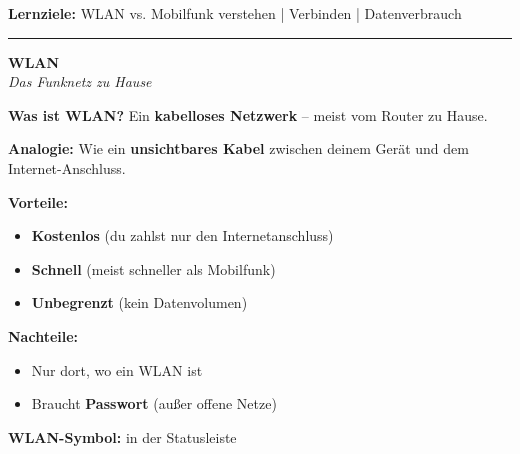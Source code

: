 \documentclass[a4paper,landscape,8pt]{extarticle}
\begin{document}

 \hfill
{\footnotesize\textbf{Lernziele:} WLAN vs. Mobilfunk verstehen | Verbinden | Datenverbrauch}

\vspace{1mm}
\hrule
\vspace{1mm}

\begin{minipage}[t]{0.32\linewidth}
\begin{center}
\colorbox{wlanblue!10}{%
\begin{minipage}{0.95\linewidth}
\vspace{2mm}
\begin{center}
{\Large\bfseries\textcolor{wlanblue}{WLAN}}\\[1pt]
{\footnotesize\itshape Das Funknetz zu Hause}
\end{center}
\vspace{2mm}
\end{minipage}%
}
\end{center}

\vspace{1mm}

\textbf{Was ist WLAN?} Ein \textbf{kabelloses Netzwerk} -- meist vom Router zu Hause.

\textbf{Analogie:} Wie ein \textbf{unsichtbares Kabel} zwischen deinem Gerät und dem Internet-Anschluss.

\textbf{Vorteile:}
\begin{itemize}
\item \textbf{Kostenlos} (du zahlst nur den Internetanschluss)
\item \textbf{Schnell} (meist schneller als Mobilfunk)
\item \textbf{Unbegrenzt} (kein Datenvolumen)
\end{itemize}

\textbf{Nachteile:}
\begin{itemize}
\item Nur dort, wo ein WLAN ist
\item Braucht \textbf{Passwort} (außer offene Netze)
\end{itemize}

\textbf{WLAN-Symbol:}  in der Statusleiste


\end{minipage}
\end{document}
